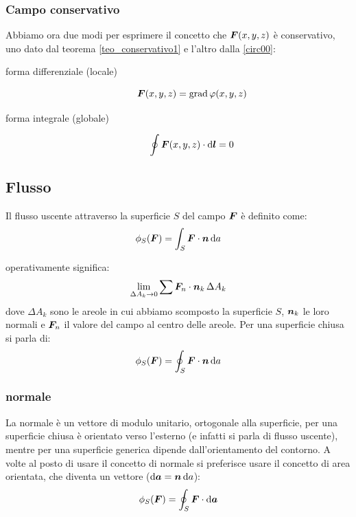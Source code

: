 \subsubsection{Campo conservativo}
Abbiamo ora due modi per esprimere il concetto che $\boldsymbol{F}(x,y,z)$ è conservativo, uno dato dal teorema \ref{teo_conservativo1} e l'altro dalla \eqref{circ00}:
\begin{description}
\item[forma differenziale (locale)]\begin{equation*}\boldsymbol{F}(x,y,z)=\operatorname{grad}\varphi(x,y,z)\end{equation*}
\item[forma integrale (globale)]\begin{equation*}\oint\boldsymbol{F}(x,y,z)\cdot\mathrm{d}\boldsymbol{l}=0\end{equation*}
\end{description}
\subsection{Flusso}
\begin{Def}
Il flusso uscente attraverso la superficie $S$ del campo $\boldsymbol{F}$ è definito come:
\begin{equation*}\phi_S(\boldsymbol{F})=\int_S \boldsymbol{F}\cdot \boldsymbol{n}\, \mathrm{d} a\end{equation*}
\end{Def}
operativamente significa:
\begin{equation*}\lim_{\Delta A_k\to 0}\sum \boldsymbol{F}_n\cdot \boldsymbol{n}_k\,\Delta A_k\end{equation*}
dove $\Delta A_k$ sono le areole in cui abbiamo scomposto la superficie $S$, $\boldsymbol{n}_k$ le loro normali e $\boldsymbol{F}_n$ il valore del campo al centro delle areole. Per una superficie chiusa si parla di:
\begin{equation*}\phi_S(\boldsymbol{F})=\oint_S \boldsymbol{F}\cdot \boldsymbol{n}\, \mathrm{d} a\end{equation*}
\subsubsection{normale}
La normale è un vettore di modulo unitario, ortogonale alla superficie, per una superficie chiusa è orientato verso l'esterno (e infatti si parla di flusso uscente), mentre per una superficie generica dipende dall'orientamento del contorno. A volte al posto di usare il concetto di normale si preferisce usare il concetto di area orientata, che diventa un vettore ($\mathrm{d} \boldsymbol{a}=\boldsymbol{n}\,\mathrm{d} a$):
\begin{equation*}\phi_S(\boldsymbol{F})=\oint_S \boldsymbol{F}\cdot \mathrm{d} \boldsymbol{a}\end{equation*}
